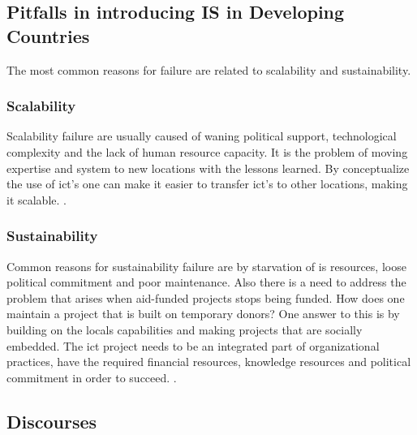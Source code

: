 \cite{rh:isdc}
\cite{ca:isdc}

\subsection{Pitfalls in introducing IS in Developing Countries}
The most common reasons for failure are related to scalability and sustainability.
\subsubsection{Scalability}
Scalability failure are usually caused of waning political support, technological complexity and the lack of human resource capacity. It is the problem of moving expertise and system to new locations with the lessons learned. By conceptualize the use of \gls{ict}'s one can make it easier to transfer \gls{ict}'s to other locations, making it scalable.
\cite{jbemss:noa}.
\subsubsection{Sustainability}
Common reasons for sustainability failure are by starvation of \gls{is} resources, loose political commitment and poor maintenance. 
Also there is a need to address the problem that arises when aid-funded projects stops being funded.
How does one maintain a project that is built on temporary donors?
One answer to this is by building on the locals capabilities and making projects that are socially embedded. The \gls{ict} project needs to be an integrated part of organizational practices, have   the required financial resources, knowledge resources and political commitment in order to succeed.
\cite{jbemss:noa}.  


\subsection{Discourses}
\label{subsec:discourses}

